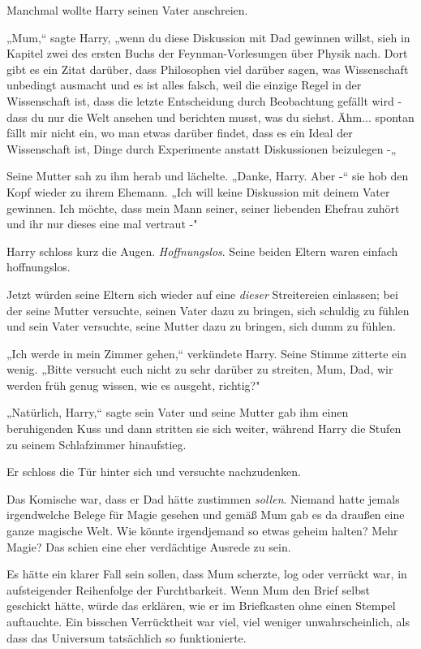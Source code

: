 {Manchmal wollte Harry seinen Vater anschreien.

„Mum,“ sagte Harry, „wenn du diese Diskussion mit Dad gewinnen willst, sieh in Kapitel zwei des ersten Buchs der Feynman-Vorlesungen über Physik nach. Dort gibt es ein Zitat darüber, dass Philosophen viel darüber sagen, was Wissenschaft unbedingt ausmacht und es ist alles falsch, weil die einzige Regel in der Wissenschaft ist, dass die letzte Entscheidung durch Beobachtung gefällt wird - dass du nur die Welt ansehen und berichten musst, was du siehst. Ähm... spontan fällt mir nicht ein, wo man etwas darüber findet, dass es ein Ideal der Wissenschaft ist, Dinge durch Experimente anstatt Diskussionen beizulegen -„

Seine Mutter sah zu ihm herab und lächelte. „Danke, Harry. Aber -“ sie hob den Kopf wieder zu ihrem Ehemann. „Ich will keine Diskussion mit deinem Vater gewinnen. Ich möchte, dass mein Mann seiner, seiner liebenden Ehefrau zuhört und ihr nur dieses eine mal vertraut -"

Harry schloss kurz die Augen. \emph{Hoffnungslos}. Seine beiden Eltern waren einfach hoffnungslos.

Jetzt würden seine Eltern sich wieder auf eine \emph{dieser} Streitereien einlassen; bei der seine Mutter versuchte, seinen Vater dazu zu bringen, sich schuldig zu fühlen und sein Vater versuchte, seine Mutter dazu zu bringen, sich dumm zu fühlen.

„Ich werde in mein Zimmer gehen,“ verkündete Harry. Seine Stimme zitterte ein wenig. „Bitte versucht euch nicht zu sehr darüber zu streiten, Mum, Dad, wir werden früh genug wissen, wie es ausgeht, richtig?"

„Natürlich, Harry,“ sagte sein Vater und seine Mutter gab ihm einen beruhigenden Kuss und dann stritten sie sich weiter, während Harry die Stufen zu seinem Schlafzimmer hinaufstieg.

Er schloss die Tür hinter sich und versuchte nachzudenken.

Das Komische war, dass er Dad hätte zustimmen \emph{sollen}. Niemand hatte jemals irgendwelche Belege für Magie gesehen und gemäß Mum gab es da draußen eine ganze magische Welt. Wie könnte irgendjemand so etwas geheim halten? Mehr Magie? Das schien eine eher verdächtige Ausrede zu sein.

Es hätte ein klarer Fall sein sollen, dass Mum scherzte, log oder verrückt war, in aufsteigender Reihenfolge der Furchtbarkeit. Wenn Mum den Brief selbst geschickt hätte, würde das erklären, wie er im Briefkasten ohne einen Stempel auftauchte. Ein bisschen Verrücktheit war viel, viel weniger unwahrscheinlich, als dass das Universum tatsächlich so funktionierte.

}
